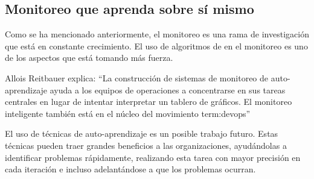\subsection{Monitoreo que aprenda sobre sí mismo}
\label{que-aprenda}

Como se ha mencionado anteriormente, el monitoreo es una rama de investigación
que está en constante crecimiento. El uso de algoritmos de
 en el monitoreo es uno de los aspectos que está tomando
más fuerza.

Allois Reitbauer explica: “La construcción de sistemas de monitoreo de
auto-aprendizaje ayuda a los equipos de operaciones a concentrarse en sus tareas
centrales en lugar de intentar interpretar un tablero de gráficos. El monitoreo
inteligente también está en el núcleo del movimiento \gls{term:devops}”
\cite[Prefacio]{monitoreo:anomaly_detection_for_monitoring}

El uso de técnicas de auto-aprendizaje es un posible trabajo futuro.
Estas técnicas pueden traer grandes beneficios a las organizaciones,
ayudándolas a identificar problemas rápidamente, realizando esta tarea con mayor
precisión en cada iteración e incluso adelantándose a que los problemas ocurran.
